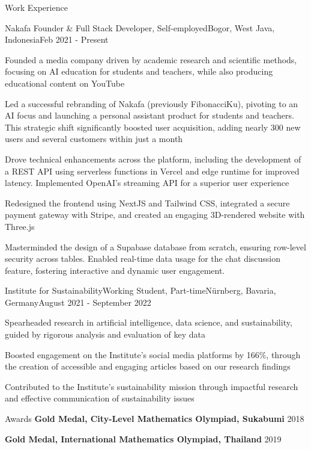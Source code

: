 \documentclass{article}
\newlength{\tabin}
\newlength{\secsep}
\newcommand{\lineunder}{\vspace*{-6pt} \\ \hspace*{-6pt} \hrulefill \\ \vspace*{-15pt}}
\newenvironment{tabbedsection}[1]{
  \begin{list}{}{
      \setlength{\itemsep}{0pt}
      \setlength{\labelsep}{0pt}
      \setlength{\labelwidth}{0pt}
      \setlength{\leftmargin}{\tabin}
      \setlength{\rightmargin}{\tabin}
      \setlength{\listparindent}{0pt}
      \setlength{\parsep}{0pt}
      \setlength{\parskip}{0pt}
      \setlength{\partopsep}{0pt}
      \setlength{\topsep}{#1}
    }
  \item[]
}{\end{list}}
\newenvironment{resume_section}[1]{
  \vspace{1.5\secsep}
  \textsc{\large#1}
  \lineunder
  \begin{tabbedsection}{\secsep}
}{\end{tabbedsection}}
\newenvironment{subitems}{
  \renewcommand{\labelitemi}{-}
  \begin{itemize}
      \setlength{\labelsep}{1em}
}{\end{itemize}}
\newenvironment{resume_employer}[4]{
  \vspace{\secsep}
  \textbf{#1} \\ 
  \indent {\small #2} \hfill {\footnotesize#3 (#4)}
  \begin{tabbedsection}{0pt}
  \begin{subitems}
}{\end{subitems}\end{tabbedsection}}
\begin{document}
\begin{resume_section}{Work Experience}
      \begin{resume_employer}{Nakafa \href{https://www.nakafa.com}{}}{Founder \& Full Stack Developer, Self-employed}{Bogor, West Java, Indonesia}{Feb 2021 - Present}
        \item Founded a media company driven by academic research and scientific methods, focusing on AI education for students and teachers, while also producing educational content on YouTube
        \item Led a successful rebranding of Nakafa (previously FibonacciKu), pivoting to an AI focus and launching a personal assistant product for students and teachers. This strategic shift significantly boosted user acquisition, adding nearly 300 new users and several customers within just a month
        \item Drove technical enhancements across the platform, including the development of a REST API using serverless functions in Vercel and edge runtime for improved latency. Implemented OpenAI's streaming API for a superior user experience
        \item Redesigned the frontend using NextJS and Tailwind CSS, integrated a secure payment gateway with Stripe, and created an engaging 3D-rendered website with Three.js
        \item Masterminded the design of a Supabase database from scratch, ensuring row-level security across tables. Enabled real-time data usage for the chat discussion feature, fostering interactive and dynamic user engagement.
      \end{resume_employer}

      \begin{resume_employer}{Institute for Sustainability}{Working Student, Part-time}{Nürnberg, Bavaria, Germany}{August 2021 - September 2022}
        \item Spearheaded research in artificial intelligence, data science, and sustainability, guided by rigorous analysis and evaluation of key data
        \item Boosted engagement on the Institute's social media platforms by 166\%, through the creation of accessible and engaging articles based on our research findings
        \item Contributed to the Institute's sustainability mission through impactful research and effective communication of sustainability issues
      \end{resume_employer}
    \end{resume_section}

    \begin{resume_section}{Awards}
  \textbf{Gold Medal, City-Level Mathematics Olympiad, Sukabumi} \hfill {\footnotesize 2018} \par
  \vspace{\secsep}
  \textbf{Gold Medal, International Mathematics Olympiad, Thailand} \hfill {\footnotesize 2019} \par
\end{resume_section}
\end{document}
